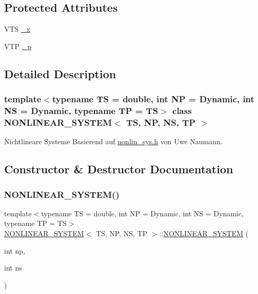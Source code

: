 \subsection*{Protected Attributes}
\begin{DoxyCompactItemize}
\item 
V\+TS \mbox{\hyperlink{class_n_o_n_l_i_n_e_a_r___s_y_s_t_e_m_a06e2289a0e10aa47527d5fd348faf4f9}{\+\_\+x}}
\item 
V\+TP \mbox{\hyperlink{class_n_o_n_l_i_n_e_a_r___s_y_s_t_e_m_aee48110f36d056d217437af5e7cc5447}{\+\_\+p}}
\end{DoxyCompactItemize}


\subsection{Detailed Description}
\subsubsection*{template$<$typename TS = double, int NP = Dynamic, int NS = Dynamic, typename TP = TS$>$\newline
class N\+O\+N\+L\+I\+N\+E\+A\+R\+\_\+\+S\+Y\+S\+T\+E\+M$<$ T\+S, N\+P, N\+S, T\+P $>$}

Nichtlineare Systeme Basierend auf \mbox{\hyperlink{nonlin__sys_8h}{nonlin\+\_\+sys.\+h}} von Uwe Naumann. 

\subsection{Constructor \& Destructor Documentation}
\mbox{\label{class_n_o_n_l_i_n_e_a_r___s_y_s_t_e_m_aa6073542adb090bf99729df5b03ca707}} 
\subsubsection{\texorpdfstring{N\+O\+N\+L\+I\+N\+E\+A\+R\+\_\+\+S\+Y\+S\+T\+E\+M()}{NONLINEAR\_SYSTEM()}}
{\footnotesize\ttfamily template$<$typename TS = double, int NP = Dynamic, int NS = Dynamic, typename TP = TS$>$ \\
\mbox{\hyperlink{class_n_o_n_l_i_n_e_a_r___s_y_s_t_e_m}{N\+O\+N\+L\+I\+N\+E\+A\+R\+\_\+\+S\+Y\+S\+T\+EM}}$<$ TS, NP, NS, TP $>$\+::\mbox{\hyperlink{class_n_o_n_l_i_n_e_a_r___s_y_s_t_e_m}{N\+O\+N\+L\+I\+N\+E\+A\+R\+\_\+\+S\+Y\+S\+T\+EM}} (\begin{DoxyParamCaption}\item[{int}]{np,  }\item[{int}]{ns }\end{DoxyParamCaption})\hspace{0.3cm}{\ttfamily [inline]}}



